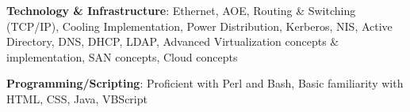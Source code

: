 \begin{resume}
\textbf{Technology \& Infrastructure}: Ethernet, AOE, Routing \& Switching (TCP/IP), Cooling Implementation, Power Distribution, Kerberos, NIS, Active Directory, DNS, DHCP, LDAP, Advanced Virtualization concepts \& implementation, SAN concepts, Cloud concepts

\textbf{Programming/Scripting}: Proficient with Perl and Bash, Basic familiarity with HTML, CSS, Java, VBScript










\end{resume}

